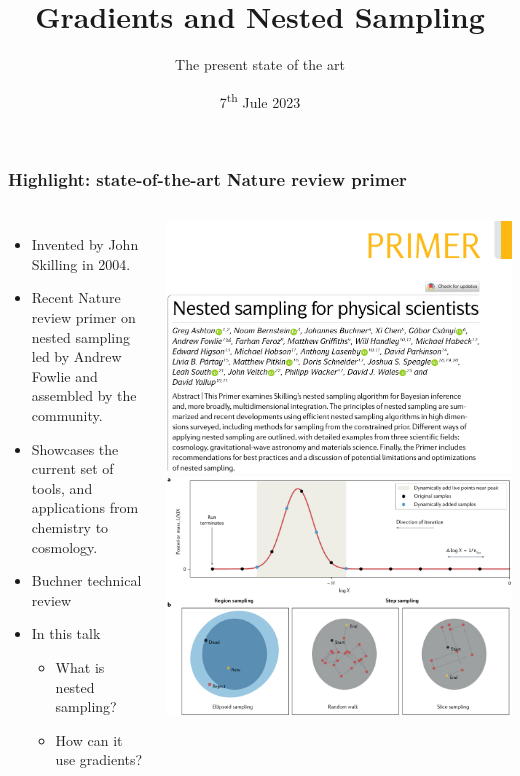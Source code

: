 \documentclass[aspectratio=169]{beamer}
\title{Gradients and Nested Sampling}
\subtitle{The present state of the art}
\date{7\textsuperscript{th} Jule 2023}
\begin{document}
\begin{frame}
    \titlepage
\end{frame}

\begin{frame}
    \frametitle{Highlight: state-of-the-art Nature review primer  }
    \begin{columns}
        \begin{itemize}
            \item Invented by John Skilling in 2004.
            \item Recent Nature review primer on nested sampling led by Andrew Fowlie and assembled by the community.
            \item Showcases the current set of tools, and applications from chemistry to cosmology.
            \item Buchner technical review 
            \item In this talk
                \begin{itemize}
                    \item What is nested sampling?
                    \item How can it use gradients?
                \end{itemize}
        \end{itemize}
        \includegraphics[width=\textwidth]{figures/nature1}
        \includegraphics[width=\textwidth]{figures/nature2}

\end{columns}
\end{frame}
\end{document}
